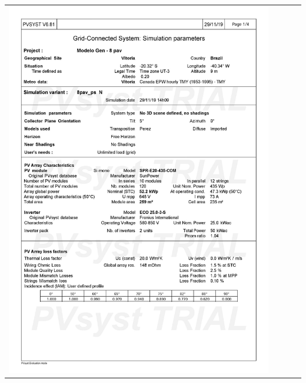 \begin{table}[H]
    \centering
    \begin{tabular}{l}
        \includegraphics[width=0.9\textwidth]{figures/attachments/resultpv17.jpg}
    \end{tabular}
\end{table}
\pagebreak
